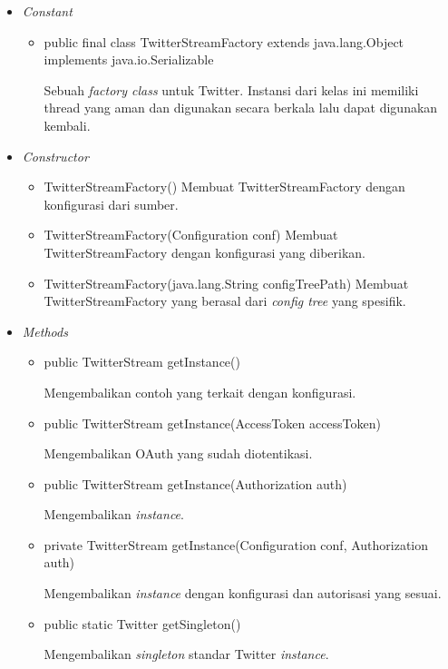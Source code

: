 	\begin{itemize}
		\item \textit{Constant}
		
		\begin{itemize}
			\item public final class TwitterStreamFactory
			extends java.lang.Object
			implements java.io.Serializable
			
			Sebuah \textit{factory class} untuk Twitter. Instansi dari kelas ini memiliki thread yang aman dan digunakan secara berkala lalu dapat digunakan kembali.
		\end{itemize}
		\item \textit{Constructor}
		
		\begin{itemize}
			\item TwitterStreamFactory()
			Membuat TwitterStreamFactory dengan konfigurasi dari sumber.
			\item TwitterStreamFactory(Configuration conf)
			Membuat TwitterStreamFactory dengan konfigurasi yang diberikan.
			\item TwitterStreamFactory(java.lang.String configTreePath)
			Membuat TwitterStreamFactory yang berasal dari \textit{config tree} yang spesifik.
		\end{itemize}
		\item \textit{Methods}
		
		\begin{itemize}
			\item public TwitterStream getInstance()
			
			Mengembalikan contoh yang terkait dengan konfigurasi.
			\item public TwitterStream getInstance(AccessToken accessToken)
			
			Mengembalikan OAuth yang sudah diotentikasi.
			\item public TwitterStream getInstance(Authorization auth)
			
			Mengembalikan \textit{instance}.
			\item private TwitterStream getInstance(Configuration conf, Authorization auth)
			
			Mengembalikan \textit{instance} dengan konfigurasi dan autorisasi yang sesuai.
			\item public static Twitter getSingleton()
			
			Mengembalikan \textit{singleton} standar Twitter \textit{instance}.
		\end{itemize}
	\end{itemize}
	
